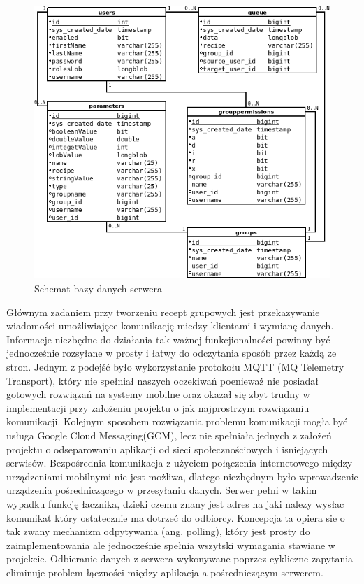 \documentclass[11pt,a4paper,polish,thesis]{dcsbook}
\begin{document}
\begin{figure}[p]
  \centering
  \includegraphics[scale=0.7]{./resources/server_db.png}
  \caption{Schemat bazy danych serwera}
  \label{fig:server_db}
\end{figure}

Głównym zadaniem przy tworzeniu recept grupowych jest przekazywanie wiadomości umożliwiajęce komunikację miedzy klientami i wymianę danych. 
Informacje niezbędne do działania tak ważnej funkcjionalności powinny być jednocześnie rozsyłane w prosty i łatwy do odczytania sposób przez każdą ze stron.
Jednym z podejść było wykorzystanie protokołu MQTT (MQ Telemetry Transport), który nie spełniał naszych oczekiwań poenieważ nie posiadał gotowych rozwiązań na systemy mobilne oraz okazał się zbyt trudny w implementacji przy założeniu projektu o jak najprostrzym rozwiązaniu komunikacji.
Kolejnym sposobem rozwiązania problemu komunikacji mogła być usługa Google Cloud Messaging(GCM), lecz nie spełniała jednych z założeń projektu o odseparowaniu aplikacji od sieci społecznościowych i isniejących serwisów.
Bezpośrednia komunikacja z użyciem połączenia internetowego między urządzeniami mobilnymi nie jest możliwa, dlatego niezbędnym było wprowadzenie urządzenia pośredniczącego w przesyłaniu danych. 
Serwer pełni w takim wypadku funkcję łacznika, dzieki czemu znany jest adres na jaki nalezy wysłac komunikat który ostatecznie ma dotrzeć do odbiorcy. 
Koncepcja ta opiera sie o tak zwany mechanizm odpytywania (ang. polling), który jest prosty do zaimplementowania ale jednocześnie spełnia wszytski wymagania stawiane w projekcie.
Odbieranie danych z serwera wykonywane poprzez cykliczne zapytania eliminuje problem łączności między aplikacja a pośredniczącym serwerem.
\end{document}
